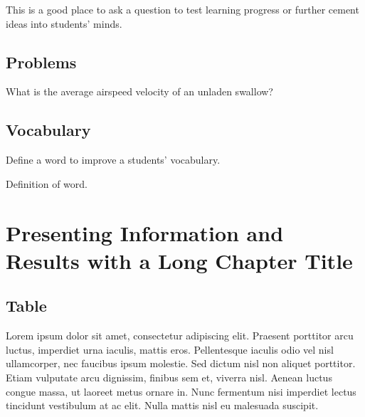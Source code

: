 \documentclass[
	11pt, %
	fleqn, %
	letterpaper, %
]{CommodoreBlueBook}
\begin{document}
\begin{exercise} %

	This is a good place to ask a question to test learning progress or further
	cement ideas into students' minds.

\end{exercise}



\section{Problems}

\begin{problem} %
	What is the average airspeed velocity of an unladen swallow?
\end{problem}


\section{Vocabulary}

Define a word to improve a students' vocabulary.

\begin{vocabulary}[Word] %
	Definition of word.
\end{vocabulary}



\chapter{Presenting Information and Results with a Long Chapter Title}

\section{Table}

Lorem ipsum dolor sit amet, consectetur adipiscing elit. Praesent porttitor
arcu luctus, imperdiet urna iaculis, mattis eros. Pellentesque iaculis odio vel
nisl ullamcorper, nec faucibus ipsum molestie. Sed dictum nisl non aliquet
porttitor. Etiam vulputate arcu dignissim, finibus sem et, viverra nisl. Aenean
luctus congue massa, ut laoreet metus ornare in. Nunc fermentum nisi imperdiet
lectus tincidunt vestibulum at ac elit. Nulla mattis nisl eu malesuada
suscipit.
\end{document}
